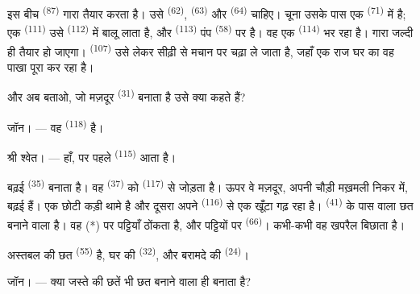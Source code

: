 इस बीच  \textsuperscript{(87)} गारा तैयार करता है। उसे
 \textsuperscript{(62)},  \textsuperscript{(63)} और
 \textsuperscript{(64)} चाहिए। चूना उसके पास एक 
\textsuperscript{(71)} में है; एक  \textsuperscript{(111)} उसे
 \textsuperscript{(112)} में बालू लाता है, और 
\textsuperscript{(113)} पंप \textsuperscript{(58)} पर है। वह एक 
\textsuperscript{(114)} भर रहा है। गारा जल्दी ही तैयार हो जाएगा।
 \textsuperscript{(107)} उसे लेकर सीढ़ी से मचान पर चढ़ा ले
जाता है, जहाँ एक राज घर का वह पाखा पूरा कर रहा है।

और अब बताओ, जो मज़दूर  \textsuperscript{(31)} बनाता है उसे क्या कहते
हैं?

\textsc{जॉन}। --- वह  \textsuperscript{(118)} है।

\VUsaut{3.0mm}
\VUsaut{3.0mm}

\textsc{श्री श्वेत}। --- हाँ, पर पहले  \textsuperscript{(115)} आता
है।

बढ़ई  \textsuperscript{(35)} बनाता है। वह 
\textsuperscript{(37)} को  \textsuperscript{(117)} से जोड़ता है। ऊपर
वे मज़दूर, अपनी चौड़ी मख़मली निकर में, बढ़ई हैं। एक छोटी कड़ी थामे है और दूसरा
अपने  \textsuperscript{(116)} से एक खूँटा गढ़ रहा है।
 \textsuperscript{(41)} के पास वाला छत बनाने वाला है। वह
 (*) पर पट्टियाँ ठोंकता है, और पट्टियों पर 
\textsuperscript{(66)}। कभी-कभी वह खपरैल बिछाता है।


अस्तबल की छत  \textsuperscript{(55)} है, घर की
 \textsuperscript{(32)}, और बरामदे की 
\textsuperscript{(24)}।

\textsc{जॉन}। --- क्या जस्ते की छतें भी छत बनाने वाला ही बनाता है?

